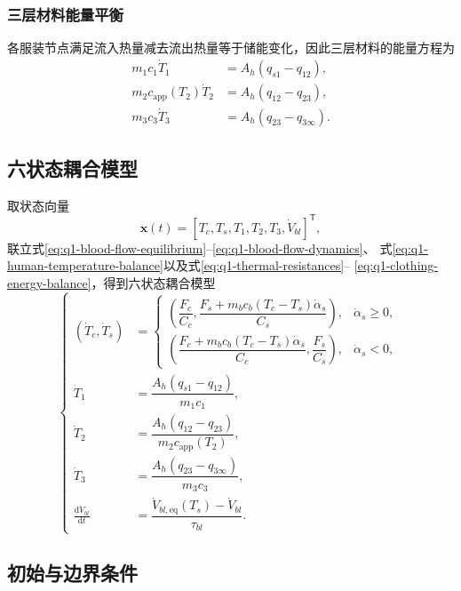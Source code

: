 \documentclass[withoutpreface,bwprint]{cumcmthesis}
\begin{document}
\subsubsection{三层材料能量平衡}

各服装节点满足流入热量减去流出热量等于储能变化，因此三层材料的能量方程为
\begin{equation}
\begin{aligned}
m_1c_1\dot T_1&=A_h(q_{s1}-q_{12}),\\
m_2c_{\mathrm{app}}(T_2)\dot T_2&=A_h(q_{12}-q_{23}),\\
m_3c_3\dot T_3&=A_h(q_{23}-q_{3\infty}).
\end{aligned}
\label{eq:q1-clothing-energy-balance}
\end{equation}

\subsection{六状态耦合模型}

取状态向量
\[
\bm x(t)=[T_c,T_s,T_1,T_2,T_3,\dot V_{bl}]^{\mathsf T},
\]
联立式\eqref{eq:q1-blood-flow-equilibrium}--\eqref{eq:q1-blood-flow-dynamics}、
式\eqref{eq:q1-human-temperature-balance}以及式\eqref{eq:q1-thermal-resistances}--
\eqref{eq:q1-clothing-energy-balance}，得到六状态耦合模型
\begin{equation}
\left\{
\begin{aligned}
(\dot T_c,\dot T_s)
&=
\begin{cases}
\left(
\dfrac{F_c}{C_c},
\dfrac{F_s+m_bc_b(T_c-T_s)\dot\alpha_s}{C_s}
\right),&\dot\alpha_s\geq0,\\[10pt]
\left(
\dfrac{F_c+m_bc_b(T_c-T_s)\dot\alpha_s}{C_c},
\dfrac{F_s}{C_s}
\right),&\dot\alpha_s<0,
\end{cases}\\
\dot T_1&=\dfrac{A_h(q_{s1}-q_{12})}{m_1c_1},\\
\dot T_2&=\dfrac{A_h(q_{12}-q_{23})}
{m_2c_{\mathrm{app}}(T_2)},\\
\dot T_3&=\dfrac{A_h(q_{23}-q_{3\infty})}{m_3c_3},\\
\frac{\mathrm d\dot V_{bl}}{\mathrm dt}
&=\dfrac{\dot V_{bl,\mathrm{eq}}(T_s)-\dot V_{bl}}{\tau_{bl}}.
\end{aligned}
\right.
\label{eq:q1-six-state-system}
\end{equation}

\subsection{初始与边界条件}
\end{document}
